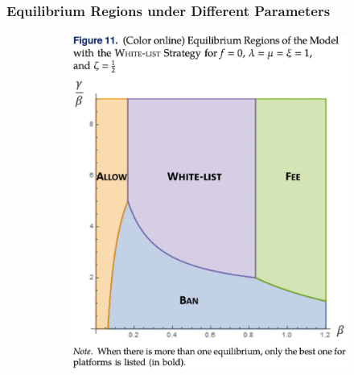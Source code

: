 \documentclass{beamer}
\begin{document}
\begin{frame}%
    \frametitle{Equilibrium Regions under Different Parameters}
    \framesubtitle{}
    \begin{figure}
        \centering
        \begin{subfigure}[b]{0.3\textwidth}
            \centering
            \includegraphics[width=\textwidth]{f11}
        \end{subfigure}
        \hfill
        \begin{subfigure}[b]{0.3\textwidth}
            \centering

\end{subfigure}
\end{figure}
\end{frame}
\end{document}
